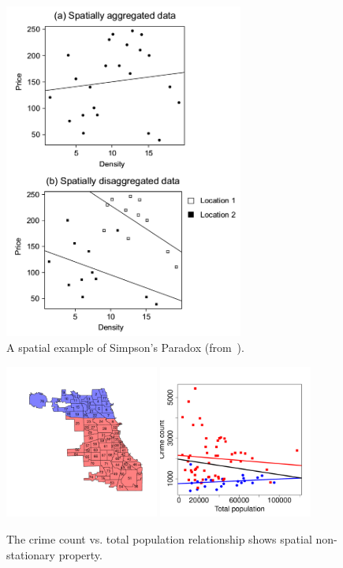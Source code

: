 \begin{figure}[h]
\centering
\includegraphics[width=0.7\textwidth]{fig/simpson.png}
\caption{A spatial example of Simpson's Paradox (from~\cite{fig:simpson}).}
\label{fig:simpson}
\end{figure}

\begin{figure}[h]
\centering
\includegraphics[width=0.45\textwidth]{fig/north-south-split.pdf}
\includegraphics[width=0.45\textwidth]{fig/crime-pop.pdf}
\caption{The crime count vs. total population relationship shows spatial non-stationary property.}
\label{fig:spa-non-sta}
\end{figure}


